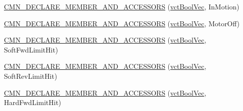 {\bf }\par
\begin{DoxyCompactItemize}
\item 
\hyperlink{classprm_actuator_state_aa7fec77a2f9d588396aca3e9aab01ba5}{C\-M\-N\-\_\-\-D\-E\-C\-L\-A\-R\-E\-\_\-\-M\-E\-M\-B\-E\-R\-\_\-\-A\-N\-D\-\_\-\-A\-C\-C\-E\-S\-S\-O\-R\-S} (\hyperlink{vct_dynamic_vector_types_8h_aeb2237c134aee3769198bd9d55c8a9e0}{vct\-Bool\-Vec}, In\-Motion)
\end{DoxyCompactItemize}

{\bf }\par
\begin{DoxyCompactItemize}
\item 
\hyperlink{classprm_actuator_state_ae9a9d598176d8a3134df160d5e53ca57}{C\-M\-N\-\_\-\-D\-E\-C\-L\-A\-R\-E\-\_\-\-M\-E\-M\-B\-E\-R\-\_\-\-A\-N\-D\-\_\-\-A\-C\-C\-E\-S\-S\-O\-R\-S} (\hyperlink{vct_dynamic_vector_types_8h_aeb2237c134aee3769198bd9d55c8a9e0}{vct\-Bool\-Vec}, Motor\-Off)
\end{DoxyCompactItemize}

{\bf }\par
\begin{DoxyCompactItemize}
\item 
\hyperlink{classprm_actuator_state_a98c7cafdaf39eefe31ccff2d715ad3c0}{C\-M\-N\-\_\-\-D\-E\-C\-L\-A\-R\-E\-\_\-\-M\-E\-M\-B\-E\-R\-\_\-\-A\-N\-D\-\_\-\-A\-C\-C\-E\-S\-S\-O\-R\-S} (\hyperlink{vct_dynamic_vector_types_8h_aeb2237c134aee3769198bd9d55c8a9e0}{vct\-Bool\-Vec}, Soft\-Fwd\-Limit\-Hit)
\end{DoxyCompactItemize}

{\bf }\par
\begin{DoxyCompactItemize}
\item 
\hyperlink{classprm_actuator_state_a3c0d4d97c7d7ecb7efb1abcc5975bdbb}{C\-M\-N\-\_\-\-D\-E\-C\-L\-A\-R\-E\-\_\-\-M\-E\-M\-B\-E\-R\-\_\-\-A\-N\-D\-\_\-\-A\-C\-C\-E\-S\-S\-O\-R\-S} (\hyperlink{vct_dynamic_vector_types_8h_aeb2237c134aee3769198bd9d55c8a9e0}{vct\-Bool\-Vec}, Soft\-Rev\-Limit\-Hit)
\end{DoxyCompactItemize}

{\bf }\par
\begin{DoxyCompactItemize}
\item 
\hyperlink{classprm_actuator_state_ac109c664b1447bed87450fade3a6d500}{C\-M\-N\-\_\-\-D\-E\-C\-L\-A\-R\-E\-\_\-\-M\-E\-M\-B\-E\-R\-\_\-\-A\-N\-D\-\_\-\-A\-C\-C\-E\-S\-S\-O\-R\-S} (\hyperlink{vct_dynamic_vector_types_8h_aeb2237c134aee3769198bd9d55c8a9e0}{vct\-Bool\-Vec}, Hard\-Fwd\-Limit\-Hit)
\end{DoxyCompactItemize}

